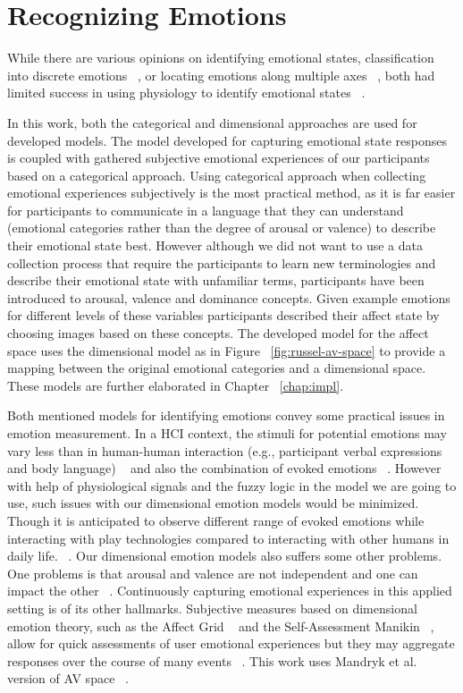 \section{Recognizing Emotions}

While there are various opinions on identifying emotional states, classification into discrete emotions ~\cite{dalgleish1999handbook}, or locating emotions along multiple axes ~\cite{russell1989affect, lang1995emotion}, both had limited success in using physiology to identify emotional states ~\cite{cacioppo2000psychophysiology}.

In this work, both the categorical and dimensional approaches are used for developed models. The model developed for capturing emotional state responses is coupled with gathered subjective emotional experiences of our participants based on a categorical approach. Using categorical approach when collecting emotional experiences subjectively is the most practical method, as it is far easier for participants to communicate in a language that they can understand (emotional categories rather than the degree of arousal or valence) to describe their emotional state best. However although we did not want to use a data collection process that require the participants to learn new terminologies and describe their emotional state with unfamiliar terms, participants have been introduced to arousal, valence and dominance concepts. Given example emotions for different levels of these variables participants described their affect state by choosing images based on these concepts. The developed model for the affect space uses the dimensional model as in Figure ~\ref{fig:russel-av-space} to provide a mapping between the original emotional categories and a dimensional space. These models are further elaborated in Chapter ~\ref{chap:impl}.

Both mentioned models for identifying emotions convey some practical issues in emotion measurement. In a HCI context, the stimuli for potential emotions may vary less than in human-human interaction (e.g., participant verbal expressions and body language) ~\cite{zhang2010service} and also the combination of evoked emotions ~\cite{peter2006emotion}. However with help of physiological signals and the fuzzy logic in the model we are going to use, such issues with our dimensional emotion models would be minimized. Though it is anticipated to observe different range of evoked emotions while interacting with play technologies compared to interacting with other humans in daily life. ~\cite{zhang2010service}. Our dimensional emotion models also suffers some other problems. One problems is that arousal and valence are not independent and one can impact the other ~\cite{mandryk2007fuzzy}. Continuously capturing emotional experiences in this applied setting is of its other hallmarks. Subjective measures based on dimensional emotion theory, such as the Affect Grid ~\cite{russell1989affect} and the Self-Assessment Manikin ~\cite{bradley1994measuring}, allow for quick assessments of user emotional experiences but they may aggregate responses over the course of many events ~\cite{zhang2010service}. This work uses Mandryk et al. version of AV space ~\cite{mandryk2007fuzzy}.

